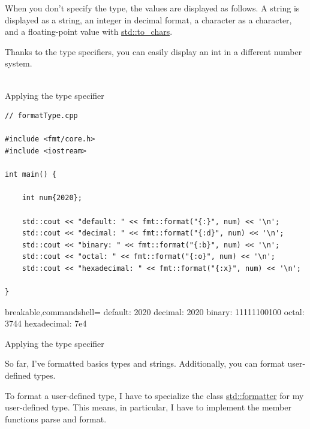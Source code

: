 When you don’t specify the type, the values are displayed as follows. A string is displayed as a string, an integer in decimal format, a character as a character, and a floating-point value with \href{https://en.cppreference.com/w/cpp/utility/to_chars}{std::to\_chars}.

Thanks to the type specifiers, you can easily display an int in a different number system.

\hspace*{\fill} \\ %
\noindent
Applying the type specifier
\begin{lstlisting}[style=styleCXX]
// formatType.cpp

#include <fmt/core.h>
#include <iostream>

int main() {

	int num{2020};
	
	std::cout << "default: " << fmt::format("{:}", num) << '\n';
	std::cout << "decimal: " << fmt::format("{:d}", num) << '\n';
	std::cout << "binary: " << fmt::format("{:b}", num) << '\n';
	std::cout << "octal: " << fmt::format("{:o}", num) << '\n';
	std::cout << "hexadecimal: " << fmt::format("{:x}", num) << '\n';

}
\end{lstlisting}

\begin{tcblisting}{breakable,commandshell={}}
default:     2020
decimal:     2020
binary:      11111100100
octal:       3744
hexadecimal: 7e4
\end{tcblisting}

\begin{center}
Applying the type specifier
\end{center}

So far, I’ve formatted basics types and strings. Additionally, you can format user-defined types.


To format a user-defined type, I have to specialize the class \href{https://en.cppreference.com/w/cpp/utility/format/formatter}{std::formatter} for my user-defined type. This means, in particular, I have to implement the member functions parse and format.

